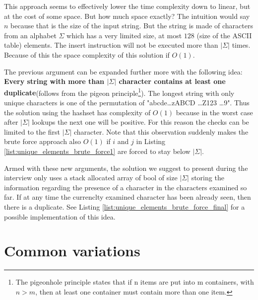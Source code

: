 This approach seems to effectively lower the time complexity down to linear, but at the cost of some
space. But how much space exactly? The intuition would say $n$ because that is the size of the
input string. But the string is made of characters from an alphabet $\Sigma$ which has a very
limited size, at most $128$ (size of the ASCII table) elements. The insert instruction will not be
executed more than $|\Sigma|$ times. Because of this the space complexity of this solution if
$O(1)$. 

The previous argument can be expanded further more with the following idea: \textbf{Every string
with more than $|\Sigma|$ character contains at least one duplicate}(follows from the pigeon
principle\footnote{The pigeonhole principle states that if n items are put into m containers, with
$n > m$, then at least one container must contain more than one item.}). The longest string with
only unique characters is one of the permutation of "abcde\ldots zABCD \ldots Z123 \ldots 9". Thus
the solution using the hashset has complexity of $O(1)$ because in the worst case after $|\Sigma|$
lookups the next one will be positive. For this reason the checks can be limited to the first
$|\Sigma|$ character. Note that this observation suddenly makes the brute force approach also $O(1)$
if $i$ and $j$ in Listing \ref{list:unique_elements_brute_force1} are forced to stay below
$|\Sigma|$.

Armed with these new arguments, the solution we suggest to present during the interview only uses a
stack allocated array of bool of size $|\Sigma|$ storing the information regarding the presence of a
character in the characters examined so far. If at any time the currenclty examined character has
been already seen, then there is a duplicate. See Listing
\ref{list:unique_elements_brute_force_final} for a possible implementation of this idea.

\begin{minipage}{\linewidth}
	
\end{minipage}

\section{Common variations}
